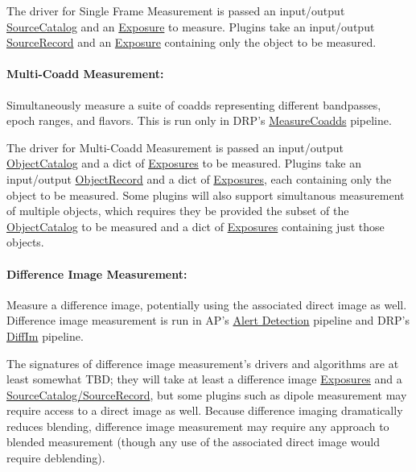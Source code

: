 The driver for Single Frame Measurement is passed an input/output \hyperref[sec:spTablesSource]{SourceCatalog} and an \hyperref[sec:spImagesExposure]{Exposure} to measure.  Plugins take an input/output \hyperref[sec:spTablesSource]{SourceRecord} and an \hyperref[sec:spImagesExposure]{Exposure} containing only the object to be measured.

\paragraph{Multi-Coadd Measurement:} Simultaneously measure a suite of coadds representing different bandpasses, epoch ranges, and flavors.  This is run only in DRP's \hyperref[sec:drpMeasureCoadds]{MeasureCoadds} pipeline.
\label{sec:acMultiCoaddMeasurement}

The driver for Multi-Coadd Measurement is passed an input/output \hyperref[sec:spTablesObject]{ObjectCatalog} and a dict of \hyperref[sec:spImagesExposure]{Exposures} to be measured.  Plugins take an input/output \hyperref[sec:spTablesObject]{ObjectRecord} and a dict of \hyperref[sec:spImagesExposure]{Exposures}, each containing only the object to be measured.  Some plugins will also support simultanous measurement of multiple objects, which requires they be provided the subset of the \hyperref[sec:spTablesObject]{ObjectCatalog} to be measured and a dict of \hyperref[sec:spImagesExposure]{Exposures} containing just those objects.

\paragraph{Difference Image Measurement:} Measure a difference image, potentially using the associated direct image as well.  Difference image measurement is run in AP's \hyperref[sec:apAlertDetection]{Alert Detection} pipeline and DRP's \hyperref[sec:drpDiffIm]{DiffIm} pipeline.
\label{sec:acDiffImMeasurement}

The signatures of difference image measurement's drivers and algorithms are at least somewhat TBD; they will take at least a difference image \hyperref[sec:spImagesExposure]{Exposures} and a \hyperref[sec:spTablesSource]{SourceCatalog/SourceRecord}, but some plugins such as dipole measurement may require access to a direct image as well.  Because difference imaging dramatically reduces blending, difference image measurement may require any approach to blended measurement (though any use of the associated direct image would require deblending).

